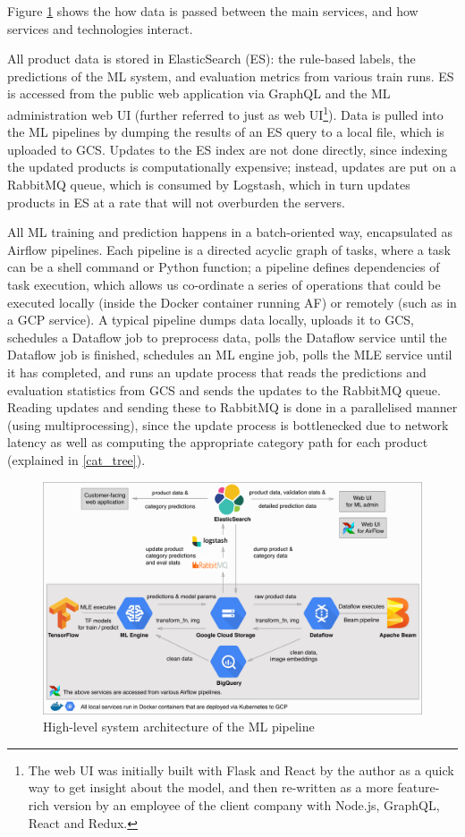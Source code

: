 Figure \ref{arch_diagram} shows the how data is passed between the main services, and how services and technologies interact.

All product data is stored in ElasticSearch (ES): the rule-based labels, the predictions of the ML system, and evaluation metrics from various train runs.
ES is accessed from the public web application via GraphQL and the ML administration web UI (further referred to just as web UI\footnote{The web UI was initially built with Flask and React by the author as a quick way to get insight about the model, and then re-written as a more feature-rich version by an employee of the client company with Node.js, GraphQL, React and Redux.}).
Data is pulled into the ML pipelines by dumping the results of an ES query to a local file, which is uploaded to GCS.
Updates to the ES index are not done directly, since indexing the updated products is computationally expensive; instead, updates are put on a RabbitMQ queue, which is consumed by Logstash, which in turn updates products in ES at a rate that will not overburden the servers.

All ML training and prediction happens in a batch-oriented way, encapsulated as Airflow pipelines.
Each pipeline is a directed acyclic graph of tasks, where a task can be a shell command or Python function; a pipeline defines dependencies of task execution, which allows us co-ordinate a series of operations that could be executed locally (inside the Docker container running AF) or remotely (such as in a GCP service).
A typical pipeline dumps data locally, uploads it to GCS, schedules a Dataflow job to preprocess data, polls the Dataflow service until the Dataflow job is finished, schedules an ML engine job, polls the MLE service until it has completed, and runs an update process that reads the predictions and evaluation statistics from GCS and sends the updates to the RabbitMQ queue.
Reading updates and sending these to RabbitMQ is done in a parallelised manner (using multiprocessing), since the update process is bottlenecked due to network latency as well as computing the appropriate category path for each product (explained in \ref{cat_tree}).

\begin{figure}
  \hspace*{-0.2\textwidth}
  \includegraphics[width=1.4\textwidth]{diagrams/architecture}
  \caption{High-level system architecture of the ML pipeline}
  \label{arch_diagram}
\end{figure}

